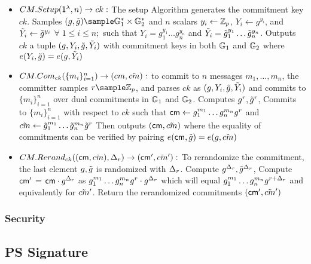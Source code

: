 \begin{itemize}
    \item $CM.Setup(\mathsf{1^{\lambda}}, n) \to ck:$ The setup Algorithm generates the commitment key $ck$. Samples $(g, \tilg) \sample \G_1^* \times \G_2^*$ and $n$ scalars $y_i \gets \mathbb{Z}_p$, $Y_i \gets g^{y_i}$, and $\tilde{Y}_i \gets \tilde{g}^{y_i}$ $\forall \; 1 \leq i \leq n;$ such that $Y_i = g_1^{y_1}\dots g_n^{y_n}$ and $\tilde{Y}_i = \tilde{g}_1^{y_1}\dots \tilde{g}_n^{y_n}$. Outputs $ck$ a tuple $(g, Y_i, \tilde{g}, \tilde{Y}_i)$ with commitment keys in both $\mathbb{G}_1$ and $\mathbb{G}_2$ where $e(Y_i,\tilde{g}) = e(g,\tilde{Y}_i)$

    \item $CM.Com_{ck}(\{m_i\}^n_{i=1}) \to (cm, \tilde{cm}):$ to commit to $n$ messages $m_1, \dots, m_n$, the committer samples $r \sample \Zp$, and parses $ck$ as $(g, Y_i, \tilde{g}, \tilde{Y}_i)$ and commits to $\{m_i\}^n_{i=1}$ over dual commitments in $\mathbb{G}_1$ and $\mathbb{G}_2$. Computes $g^r, \tilde{g}^r$, Commits to $\{m_i\}^n_{i=1}$ with respect to $ck$ such that $\mathsf{cm} \gets g_1^{m_1}\dots g_n^{m_n} g^r$ and $\tilde{cm} \gets \tilde{g}_1^{m_1} \dots \tilde{g}_n^{m_n}\tilde{g}^r$ Then outputs $(\mathsf{cm}, \tilde{cm})$ where the equality of commitments can be verified by pairing $e(\mathsf{cm}, \tilde{g}) = e(g, \tilde{cm})$
    
    \item $CM.Rerand_{ck}((\mathsf{cm}, \tilde{cm}), \Delta_r) \to (\mathsf{cm}', \tilde{cm}'):$ To rerandomize the commitment, the last element $g, \tilde{g}$ is randomized with $\Delta_r$. Compute $g^{\Delta_r}, \tilde{g}^{\Delta_r}$, Compute $\mathsf{cm}'$ = $\mathsf{cm} \cdot g^{\Delta_r}$ as $g_1^{m_1}\dots g_n^{m_n} g^r \cdot g^{\Delta_r}$ which will equal $g_1^{m_1}\dots g_n^{m_n} g^{r + \Delta_r}$ and equivalently for $\tilde{cm}'$. Return the rerandomized commitments $(\mathsf{cm}', \tilde{cm}')$
    
\end{itemize}

\subsubsection{Security}


\subsection{PS Signature}
